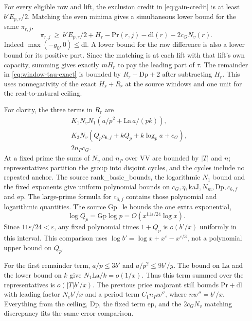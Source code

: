 \documentclass[12pt,letterpaper]{article}
\DeclareRobustCommand{\id}[1]{\mbox{\small\ttfamily #1}}
\begin{document}
For every eligible row and lift, the exclusion credit in \eqref{eq:gain-credit} is at least \(b'E_{p,r}/2\). Matching the even minima gives a simultaneous lower bound for the same \(\pi_{r,j}\),
\begin{equation}
       \pi_{r,j}\ \ge\ b'E_{p,r}/2 + H_r
              - \mathrm{Pr}(r,j) - \mathrm{dl}(r) - 2c_GN_v(r).
       \label{eq:window-row-credit}
\end{equation}
Indeed \(\max(-g_0,0)\le\mathrm{dl}\). A lower bound for the raw difference is also a lower bound for its positive part. Since the matching is at each lift with that lift's own capacity, summing gives exactly \(mH_r\) to pay the leading part of \(\tau\). The remainder in \eqref{eq:window-tau-exact} is bounded by \(R_r+\mathrm{Dp}+2\) after subtracting \(H_r\). This uses nonnegativity of the exact \(H_r+R_r\) at the source windows and one unit for the real-to-natural ceiling.

For clarity, the three terms in \(R_r\) are
\begin{align*}
 &K_1 N_v N_1\left(a/p^2+\mathrm{La}\,a/(pk)\right),\\
 &K_2 N_v\left(Q_p c_{6,f}+kQ_p+k\log_p a+c_G\right),\\
 &2 n_P c_G .
\end{align*}
At a fixed prime the sums of \(N_v\) and \(n_P\) over \id{VV} are bounded by \(|T|\) and \(n\); representatives partition the group into disjoint cycles, and the cycles include no repeated anchor. The source \id{rank\_basic\_bounds}, the logarithmic \(N_1\) bound and the fixed exponents give uniform polynomial bounds on \(c_G,\eta,\mathrm{kaJ},N_m,\mathrm{Dp},c_{6,f}\) and \(\mathrm{ep}\). The large-prime formula for \(c_{6,f}\) contains those polynomial and logarithmic quantities. The source \id{Gp\_le} bounds the one extra exponential,
\[
       \log Q_p=\mathrm{Gp}\log p=O\!\left(x^{11\varepsilon/24}\log x\right).
\]
Since \(11\varepsilon/24<\varepsilon\), any fixed polynomial times \(1+Q_p\) is \(o(b'/x)\) uniformly in this interval. This comparison uses \(\log b'=\log x+x^\varepsilon-x^{\varepsilon/3}\), not a polynomial upper bound on \(Q_p\).

For the first remainder term, \(a/p\le3b'\) and \(a/p^2\le9b'/y\). The bound on \(\mathrm{La}\) and the lower bound on \(k\) give \(N_1\mathrm{La}/k=o(1/x)\). Thus this term summed over the representatives is \(o(|T|b'/x)\). The previous price majorant still bounds \(\mathrm{Pr}+\mathrm{dl}\) with leading factor \(N_v b'/x\) and a period term \(C_1 n_Pw''\), where \(nw''=b'/x\). Everything from the ceiling, \(\mathrm{Dp}\), the fixed term \(\mathrm{ep}\), and the \(2c_GN_v\) matching discrepancy fits the same error comparison.
\end{document}
